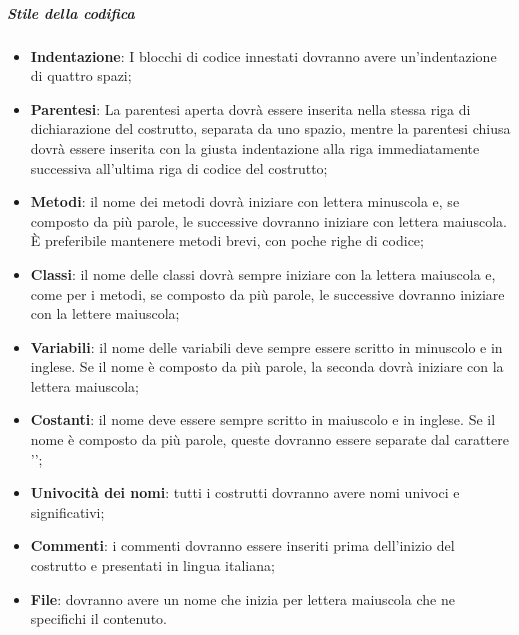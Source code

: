 \subparagraph{Stile della codifica}    \label{subparagraph:Stile della codifica}
\begin{itemize}
    \item \textbf{Indentazione}: I blocchi di codice innestati dovranno avere un'indentazione di quattro spazi;
    \item \textbf{Parentesi}: La parentesi aperta dovrà essere inserita nella stessa riga di dichiarazione del costrutto, separata da uno spazio, mentre
          la parentesi chiusa dovrà essere inserita con la giusta indentazione alla riga immediatamente successiva all'ultima riga di
          codice del costrutto;
    \item \textbf{Metodi}: il nome dei metodi dovrà iniziare con lettera minuscola e, se composto da più parole, le successive dovranno iniziare con lettera
          maiuscola. È preferibile mantenere metodi brevi, con poche righe di codice;
    \item \textbf{Classi}: il nome delle classi dovrà sempre iniziare con la lettera maiuscola e, come per i metodi, se composto da più parole, le successive
          dovranno iniziare con la lettere maiuscola;
    \item \textbf{Variabili}: il nome delle variabili deve sempre essere scritto in minuscolo e in inglese. Se il nome è composto da più parole, la seconda
          dovrà iniziare con la lettera maiuscola;
    \item \textbf{Costanti}: il nome deve essere sempre scritto in maiuscolo e in inglese. Se il nome è composto da più parole, queste dovranno essere separate
          dal carattere '\textunderscore';
    \item \textbf{Univocità dei nomi}: tutti i costrutti dovranno avere nomi univoci e significativi;
    \item \textbf{Commenti}: i commenti dovranno essere inseriti prima dell'inizio del costrutto e presentati in lingua italiana;
    \item \textbf{File}: dovranno avere un nome che inizia per lettera maiuscola che ne specifichi il contenuto.
\end{itemize}

